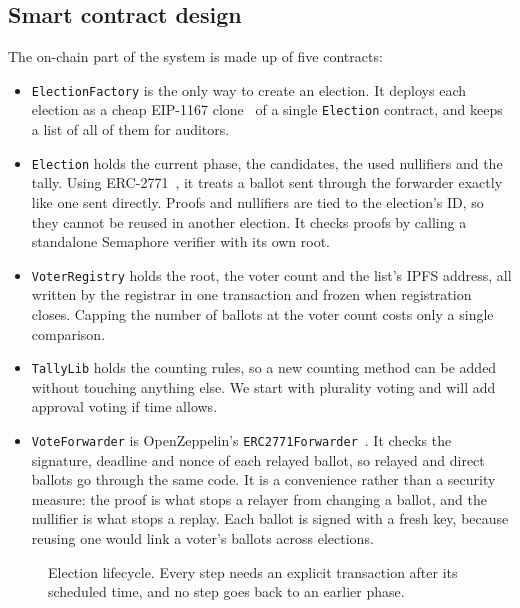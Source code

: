 \subsection{Smart contract design}

The on-chain part of the system is made up of five contracts:

\begin{itemize}
  \item \texttt{ElectionFactory} is the only way to create an election. It
        deploys each election as a cheap EIP-1167 clone~\cite{eip1167} of a
        single \texttt{Election} contract, and keeps a list of all of them for
        auditors.
  \item \texttt{Election} holds the current phase, the candidates, the used
        nullifiers and the tally. Using ERC-2771~\cite{erc2771}, it treats a
        ballot sent through the forwarder exactly like one sent directly.
        Proofs and nullifiers are tied to the election's ID, so they cannot be
        reused in another election. It checks proofs by calling a standalone
        Semaphore verifier with its own root.
  \item \texttt{VoterRegistry} holds the root, the voter count and the list's
        IPFS address, all written by the registrar in one transaction and
        frozen when registration closes. Capping the number of ballots at the
        voter count costs only a single comparison.
  \item \texttt{TallyLib} holds the counting rules, so a new counting method
        can be added without touching anything else. We start with plurality
        voting and will add approval voting if time allows.
  \item \texttt{VoteForwarder} is OpenZeppelin's
        \texttt{ERC2771Forwarder}~\cite{openzeppelin}. It checks the signature,
        deadline and nonce of each relayed ballot, so relayed and direct
        ballots go through the same code. It is a convenience rather than a
        security measure: the proof is what stops a relayer from changing a
        ballot, and the nullifier is what stops a replay. Each ballot is signed
        with a fresh key, because reusing one would link a voter's ballots
        across elections.
\end{itemize}

\begin{figure}[htbp]
  \centering
  
  \caption{Election lifecycle. Every step needs an explicit transaction after
    its scheduled time, and no step goes back to an earlier phase.}
  \label{fig:lifecycle}
\end{figure}

